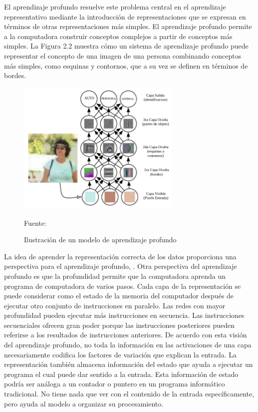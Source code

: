 	\vskip 0.4cm 
	El aprendizaje profundo resuelve este problema central en el aprendizaje representativo mediante la introducción de representaciones que se expresan en términos de otras representaciones más simples. El aprendizaje profundo permite a la computadora construir conceptos complejos a partir de conceptos más simples. La Figura 2.2 muestra cómo un sistema de aprendizaje profundo puede representar el concepto de una imagen de una persona combinando conceptos más simples, como esquinas y contornos, que a su vez se definen en términos de bordes.
		\begin{figure}[H]
		\begin{center}
		\includegraphics[width=0.7\textwidth]{images/marcoteorico/deepExam}
		\end{center}
		\begin{center}
		\caption{\small{Ilustración de un modelo de aprendizaje profundo}}
		\vskip -0.25cm
		{\small{Fuente: \cite{Goodfellow-et-al-2016}}}
		\end{center}
		\vspace{-1.5em}
		\end{figure}
	\vskip 0.4cm 
	La idea de aprender la representación correcta de los datos proporciona una perspectiva para el aprendizaje profundo, \citep{Goodfellow-et-al-2016}. Otra perspectiva del aprendizaje profundo es que la profundidad permite que la computadora aprenda un programa de computadora de varios pasos. Cada capa de la representación se puede considerar como el estado de la memoria del computador después de ejecutar otro conjunto de instrucciones en paralelo. Las redes con mayor profundidad pueden ejecutar más instrucciones en secuencia. Las instrucciones secuenciales ofrecen gran poder porque las instrucciones posteriores pueden referirse a los resultados de instrucciones anteriores. De acuerdo con esta visión del aprendizaje profundo, no toda la información en las activaciones de una capa necesariamente codifica los factores de variación que explican la entrada. La representación también almacena información del estado que ayuda a ejecutar un programa el cual puede dar sentido a la entrada. Esta información de estado podría ser análoga a un contador o puntero en un programa informático tradicional. No tiene nada que ver con el contenido de la entrada específicamente, pero ayuda al modelo a organizar su procesamiento.
